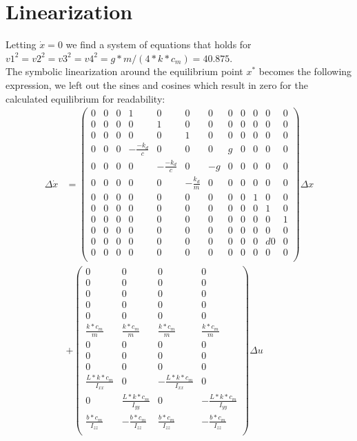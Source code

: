 \documentclass[]{article}
\begin{document}
\section{Linearization}
Letting  $\dot{x}=0$ we find a system of equations that holds for $v1^2 = v2^2 = v3^2 = v4^2 = g*m/(4*k*c_m) = 40.875$.
\\
The symbolic linearization around the equilibrium point $x^*$ becomes the following expression, we left out the sines and cosines which result in zero for the calculated equilibrium for readability: \\

\begin{align*}
\Delta \dot x &= 
\begin{pmatrix}
0 & 0 & 0 &1 &0 &0 &0 &0 &0 &0 &0 &0 \\
0 & 0 & 0 &0 &1 &0 &0 &0 &0 &0 &0 &0 \\
0 & 0 & 0 &0 &0 &1 &0 &0 &0 &0 &0 &0 \\
0 & 0 & 0 & -\frac{-k_d}{c} &0 &0 &0 & g &0 &0 &0 &0 \\
0 & 0 & 0 &0 &-\frac{-k_d}{c} &0 & -g&0 &0 &0 &0 &0 \\
0 & 0 & 0 &0 &0 &-\frac{k_d}{m} &0 &0 &0 &0 &0 &0 \\
0 & 0 & 0 &0 &0 &0 &0 &0 &0 &1 &0 &0 \\
0 & 0 & 0 &0 &0 &0 &0 &0 &0 &0 &1 &0 \\
0 & 0 & 0 &0 &0 &0 &0 &0 &0 &0 &0 &1 \\
0 & 0 & 0 &0 &0 &0 &0 &0 &0 &0 &0 &0 \\
0 & 0 & 0 &0 &0 &0 &0 &0 &0 &0 &d0 &0 \\
0 & 0 & 0 &0 &0 &0 &0 &0 &0 &0 &0 &0 \\
\end{pmatrix}\Delta x \\
& + \begin{pmatrix}
0 & 0 & 0 &0\\
0 & 0 & 0 &0\\
0 & 0 & 0 &0\\
0 & 0 & 0 &0\\
0 & 0 & 0 &0\\
\frac{k*c_m}{m} & \frac{k*c_m}{m} & \frac{k*c_m}{m}&\frac{k*c_m}{m}\\
0 & 0 & 0 &0\\
0 & 0 & 0 &0\\
0 & 0 & 0 &0\\
\frac{L*k*c_m}{I_{xx}} & 0 & -\frac{L*k*c_m}{I_{xx}} & 0 \\
0 & \frac{L*k*c_m}{I_{yy}} & 0 & - \frac{L*k*c_m}{I_{yy}} \\
\frac{b*c_m}{I_{zz}} & - \frac{b*c_m}{I_{zz}} & \frac{b*c_m}{I_{zz}} & -\frac{b*c_m}{I_{zz}} \\
\end{pmatrix} \Delta u \\
\end{align*}
\end{document}
